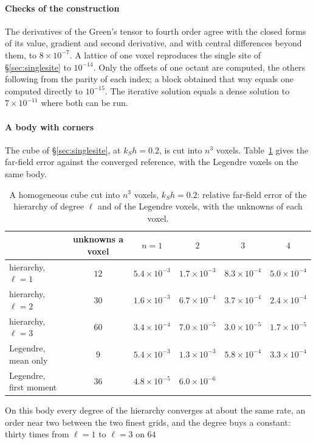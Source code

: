 \documentclass[preprint,review,12pt]{elsarticle}
\begin{document}
\paragraph{Checks of the construction} The derivatives of the Green's tensor to fourth order agree
with the closed forms of its value, gradient and second derivative, and with central differences beyond
them, to $8\times10^{-7}$. A lattice of one voxel reproduces the single site of
\S\ref{sec:singlesite} to $10^{-14}$. Only the offsets of one octant are computed, the others following
from the parity of each index; a block obtained that way equals one computed directly to $10^{-15}$.
The iterative solution equals a dense solution to $7\times10^{-11}$ where both can be run.

\paragraph{A body with corners} The cube of \S\ref{sec:singlesite}, at $k_Sh=0.2$, is cut into $n^3$
voxels. Table~\ref{tab:hiersub} gives the far-field error against the converged reference, with the
Legendre voxels on the same body.
\begin{table}[htbp]
\centering
\caption{A homogeneous cube cut into $n^3$ voxels, $k_Sh=0.2$: relative far-field error of the
hierarchy of degree $\ell$ and of the Legendre voxels, with the unknowns of each voxel.}\label{tab:hiersub}
\small
\begin{tabular}{@{}lccccc@{}}
\toprule
 & unknowns a voxel & $n=1$ & $2$ & $3$ & $4$ \\
\midrule
hierarchy, $\ell=1$ & $12$ & $5.4\times10^{-3}$ & $1.7\times10^{-3}$ & $8.3\times10^{-4}$ & $5.0\times10^{-4}$ \\
hierarchy, $\ell=2$ & $30$ & $1.6\times10^{-3}$ & $6.7\times10^{-4}$ & $3.7\times10^{-4}$ & $2.4\times10^{-4}$ \\
hierarchy, $\ell=3$ & $60$ & $3.4\times10^{-4}$ & $7.0\times10^{-5}$ & $3.0\times10^{-5}$ & $1.7\times10^{-5}$ \\
Legendre, mean only & $9$ & $5.4\times10^{-3}$ & $1.3\times10^{-3}$ & $5.8\times10^{-4}$ & $3.3\times10^{-4}$ \\
Legendre, first moment & $36$ & $4.8\times10^{-5}$ & $6.0\times10^{-6}$ & & \\
\bottomrule
\end{tabular}
\end{table}
On this body every degree of the hierarchy converges at about the same rate, an order near two between
the two finest grids, and the degree buys a constant: thirty times from $\ell=1$ to $\ell=3$ on $64$
\end{document}
